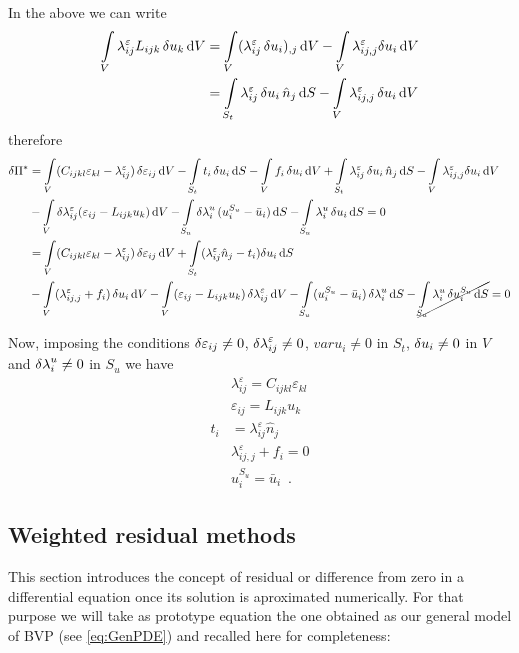 In the above we can write
\begin{align*}
\int\limits_V \lambda_{ij}^\varepsilon L_{ijk}\var{u_k}\dd{V} & = \int\limits_V (\lambda_{ij}^\varepsilon \var{u_i})_{,j}\dd{V} - \int\limits_V \lambda_{ij,j}^\varepsilon \delta {u_i}\dd{V}\\
& = \int\limits_{S_t} \lambda_{ij}^\varepsilon \var{u_i}\hat {n}_j\dd{S}  - \int\limits_V \lambda_{ij,j}^\varepsilon \var{u_i}\dd{V}
\end{align*}
therefore
\begin{align*}
\delta \Pi^* &= \int\limits_V (C_{ijkl}\varepsilon_{kl} - \lambda_{ij}^\varepsilon) \var{\varepsilon}_{ij}\dd{V} - \int\limits_{S_t} t_i \var{u}_i\dd{S} - \int\limits_V f_i \var{u}_i\dd{V} + \int\limits_{S_t} \lambda_{ij}^\varepsilon \var{u_i}\hat{n}_j\dd{S}  - \int\limits_V \lambda_{ij,j}^\varepsilon \delta {u_i}\dd{V}\\
&- \int\limits_V \delta \lambda _{ij}^\varepsilon (\varepsilon_{ij} - L_{ijk} u_k)\dd{V}  - \int\limits_{S_u} \var{\lambda}_i^u (u_i^{S_u} - \bar{u}_i)\dd{S} - \int\limits_{S_u} \lambda_i^u \var{u_i} \dd{S}  = 0\\
&= \int\limits_V (C_{ijkl}\varepsilon_{kl} - \lambda_{ij}^\varepsilon) \var{\varepsilon}_{ij}\dd{V}
+ \int\limits_{S_t} (\lambda_{ij}^\varepsilon \hat{n}_j - t_i)\delta {u_i}\dd{S}\\
&- \int\limits_V (\lambda_{ij,j}^\varepsilon  + f_i) \var{u_i}\dd{V}
- \int\limits_V (\varepsilon_{ij} - L_{ijk} u_k) \var{\lambda} _{ij}^\varepsilon\dd{V}
- \int\limits_{S_u} (u_i^{S_u} - \bar{u}_i) \var{\lambda}_i^u\dd{S}  - \cancel{\int\limits_{S_u} \lambda _i^u \var{u}_i^{S_u}\dd{S}} = 0
\end{align*}

Now, imposing the conditions $\var{\varepsilon}_{ij} \neq 0$, $\var{\lambda}_{ij}^\varepsilon  \neq 0$, $var{u}_i \neq 0$ in $S_t$, $\var{u}_i \neq 0$ in $V$ and $\var{\lambda}_i^u \neq 0$ in $S_u$ we have
\begin{align}
&\lambda_{ij}^\varepsilon  = C_{ijkl} \varepsilon_{kl}\\
&\varepsilon_{ij} = L_{ijk} u_k\\
t_i &= \lambda_{ij}^\varepsilon \hat{n}_j\\
&\lambda_{ij,j}^\varepsilon  + {f_i} = 0\\
&u_i^{S_u} = \bar{u}_i \enspace .
\end{align}

\subsection{Weighted residual methods}
This section introduces the concept of residual or difference from zero in a differential equation once its solution is aproximated numerically. For that purpose we will take as prototype equation the one obtained as our general model of BVP (see \cref{eq:GenPDE}) and recalled here for completeness:

